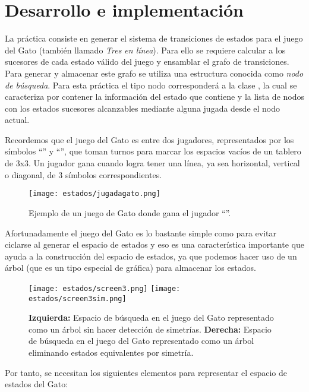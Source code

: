 \section{Desarrollo e implementaci\'on}

La práctica consiste en generar el sistema de transiciones de estados para el juego del Gato (también llamado \textit{Tres en línea}).  Para ello se requiere calcular a los sucesores de cada estado válido del juego y ensamblar el grafo de transiciones.  Para generar y almacenar este grafo se utiliza una estructura conocida como \emph{nodo de búsqueda}.  Para esta práctica el tipo nodo corresponderá a la clase , la cual se caracteriza por contener la información del estado que contiene y la lista de nodos con los estados sucesores alcanzables mediante alguna jugada desde el nodo actual.

Recordemos que el juego del Gato es entre dos jugadores, representados por los símbolos \enquote{} y \enquote{}, que toman turnos para marcar los espacios vacíos de un tablero de 3x3.
Un jugador gana cuando logra tener una línea, ya sea horizontal, vertical o diagonal, de 3 símbolos correspondientes. 

\begin{figure}
  \centering
  \texttt{[image: estados/jugadagato.png]}
  \caption{Ejemplo de un juego de Gato donde gana el jugador \enquote{}.}
  \label{fig:tictactoe}
\end{figure}

Afortunadamente el juego del Gato es lo bastante simple como para evitar ciclarse al generar el espacio de estados y eso es una característica importante que ayuda a la construcción del espacio de estados, ya que  podemos hacer uso de un árbol (que es un tipo especial de gráfica) para almacenar los estados.\par


\begin{figure}
  \centering
  \texttt{[image: estados/screen3.png]}
  \texttt{[image: estados/screen3sim.png]}
  \caption{\textbf{Izquierda:} Espacio de búsqueda en el juego del Gato representado como un árbol sin hacer detección de simetrías. \textbf{Derecha:} Espacio de búsqueda en el juego del Gato representado como un árbol eliminando estados equivalentes por simetría.}
  \label{fig:espaciogato}
\end{figure}

Por tanto, se necesitan los siguientes elementos para representar el espacio de estados del Gato:

